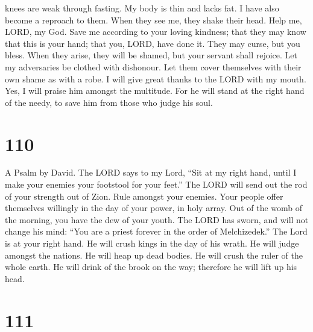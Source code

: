 knees are weak through fasting. My body is thin and lacks fat.
 I have also become a reproach to them. When they see me,
they shake their head.  Help me, LORD, my God. Save me
according to your loving kindness;  that they may know that
this is your hand; that you, LORD, have done it.  They may
curse, but you bless. When they arise, they will be shamed, but your
servant shall rejoice.  Let my adversaries be clothed with
dishonour. Let them cover themselves with their own shame as with a
robe.  I will give great thanks to the LORD with my mouth.
Yes, I will praise him amongst the multitude.  For he will
stand at the right hand of the needy, to save him from those who judge
his soul.

\hypertarget{section-100}{%
\section{110}\label{section-100}}

A Psalm by David.  The LORD says to my Lord, ``Sit at my
right hand, until I make your enemies your footstool for your feet.''
 The LORD will send out the rod of your strength out of
Zion. Rule amongst your enemies.  Your people offer
themselves willingly in the day of your power, in holy array. Out of the
womb of the morning, you have the dew of your youth.  The
LORD has sworn, and will not change his mind: ``You are a priest forever
in the order of Melchizedek.''  The Lord is at your right
hand. He will crush kings in the day of his wrath.  He will
judge amongst the nations. He will heap up dead bodies. He will crush
the ruler of the whole earth.  He will drink of the brook on
the way; therefore he will lift up his head.

\hypertarget{section-101}{%
\section{111}\label{section-101}}


